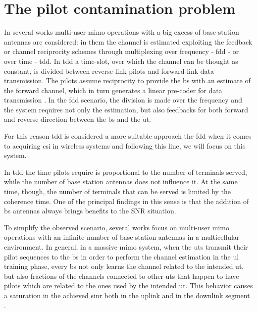 \documentclass[11pt]{book}
\begin{document}
\section{The pilot contamination problem}
In several works multi-user \gls{mimo} operations with a big excess of base station antennas are considered: in them the channel is estimated exploiting the feedback or channel reciprocity schemes through multiplexing over frequency - \gls{fdd} - or over time - \gls{tdd}. In \gls{tdd} a time-slot, over which the channel can be thought as constant, is divided between reverse-link pilots and forward-link data transmission. The pilots assume reciprocity to provide the \gls{bs} with an estimate of the forward channel, which in turn generates a linear pre-coder for data transmission \cite{Marzetta2010}. In the \gls{fdd} scenario, the division is made over the frequency and the system requires not only the estimation, but also feedbacks for both forward and reverse direction between the \gls{bs} and the \gls{ut}.

For this reason \gls{tdd} is considered a more suitable approach the \gls{fdd} when it comes to acquiring \gls{csi} in wireless systems \cite{Elijah2016} and following this line, we will focus on this system.

In \gls{tdd} the time pilots require is proportional to the number of terminals served, while the number of base station antennas does not influence it. At the same time, though, the number of terminals that can be served is limited by the coherence time. One of the principal findings in this sense is that the addition of \gls{bs} antennas always brings benefits to the SNR situation.

To simplify the observed scenario, several works focus on multi-user \gls{mimo} operations with an infinite number of base station antennas in a multicellular environment. In general, in a massive \gls{mimo} system, when the \gls{ut}s transmit their pilot sequences to the \gls{bs} in order to perform the channel estimation in the \gls{ul} training phase, every \gls{bs} not only learns the channel related to the intended \gls{ut}, but also fractions of the channels connected to other \gls{ut}s that happen to have pilots which are related to the ones used by the intended \gls{ut}. This behavior causes a saturation in the achieved \gls{sinr} both in the uplink and in the downlink segment \cite{Buzzi}.

\end{document}
